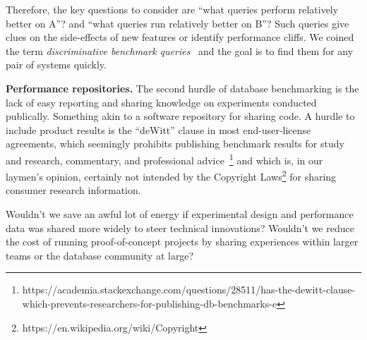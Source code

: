 \documentclass{cidr-2019}
\begin{document}
Therefore, the key questions to consider are ``what queries perform
relatively better on A''? and ``what queries run relatively better on
B''? Such queries give clues on the side-effects of new features or
identify performance cliffs. We coined the term \textit{discriminative
  benchmark queries}~\cite{DBLP:conf/sigmod/KerstenKZ18} and the goal
is to find them for any pair of systems quickly.


{\bf Performance repositories.}  The second hurdle of database
benchmarking is the lack of easy reporting and sharing knowledge on
experiments conducted publically. Something akin to a software repository for
sharing code. A hurdle to include product results is the ``deWitt''
clause in most end-user-license agreements, which seemingly prohibits
publishing benchmark results for study and research, commentary, and
professional
advice~\footnote{https://academia.stackexchange.com/questions/28511/has-the-dewitt-clause-which-prevents-researchers-for-publishing-db-benchmarks-e}
and which is, in our laymen's opinion, certainly not 
intended by the Copyright Laws\footnote{https://en.wikipedia.org/wiki/Copyright} for sharing consumer research information.

Wouldn't we save an awful lot of energy if experimental design and performance data was
shared more widely to steer technical innovations?  Wouldn't we
reduce the cost of running proof-of-concept projects by 
sharing experiences within larger teams or the database community
at large?

\end{document}
